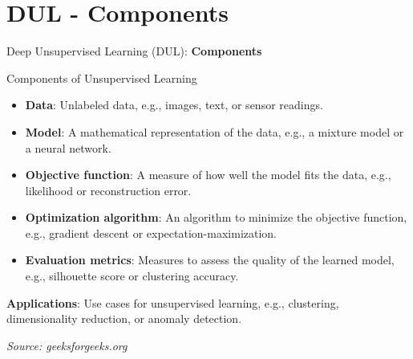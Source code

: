 \section{DUL - Components}
\begin{frame}{}
    \LARGE Deep Unsupervised Learning (DUL): \textbf{Components}
\end{frame}

\begin{frame}[allowframebreaks]{Components of Unsupervised Learning}
\begin{itemize}
    \item \textbf{Data}: Unlabeled data, e.g., images, text, or sensor readings.
    \item \textbf{Model}: A mathematical representation of the data, e.g., a mixture model or a neural network.
    \item \textbf{Objective function}: A measure of how well the model fits the data, e.g., likelihood or reconstruction error.
    \item \textbf{Optimization algorithm}: An algorithm to minimize the objective function, e.g., gradient descent or expectation-maximization.
    \item \textbf{Evaluation metrics}: Measures to assess the quality of the learned model, e.g., silhouette score or clustering accuracy.
\end{itemize}
\vspace{1em}
\textbf{Applications}: Use cases for unsupervised learning, e.g., clustering, dimensionality reduction, or anomaly detection.

\framebreak

{\small \textit{Source: geeksforgeeks.org}}
\end{frame}

